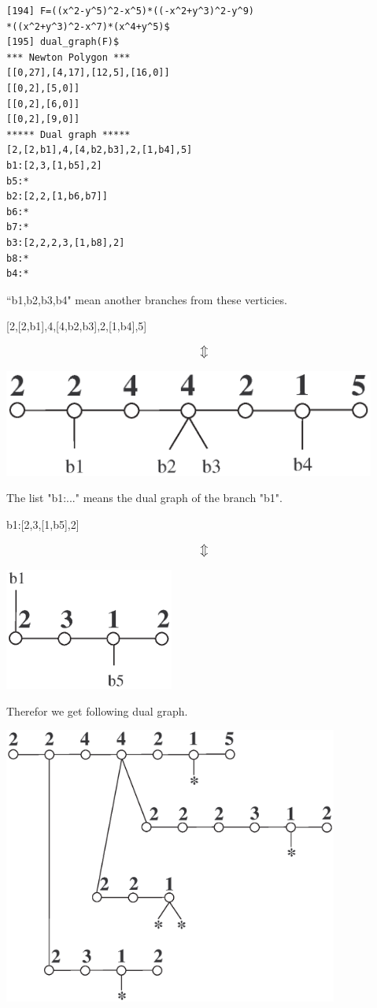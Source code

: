 \documentclass[a4paper,12pt]{article}
\begin{document}
\begin{verbatim}
[194] F=((x^2-y^5)^2-x^5)*((-x^2+y^3)^2-y^9)
*((x^2+y^3)^2-x^7)*(x^4+y^5)$
[195] dual_graph(F)$
*** Newton Polygon ***
[[0,27],[4,17],[12,5],[16,0]]
[[0,2],[5,0]]
[[0,2],[6,0]]
[[0,2],[9,0]]
***** Dual graph *****
[2,[2,b1],4,[4,b2,b3],2,[1,b4],5]
b1:[2,3,[1,b5],2]
b5:*
b2:[2,2,[1,b6,b7]]
b6:*
b7:*
b3:[2,2,2,3,[1,b8],2]
b8:*
b4:*
\end{verbatim}

``b1,b2,b3,b4" mean another branches from these verticies.

\begin{center}
{\large [2,[2,b1],4,[4,b2,b3],2,[1,b4],5]}
\end{center}
$$\big\Updownarrow$$
 \centerline{
  \includegraphics*[height=3.5cm]{ex2dual1.eps}
 }
\vspace*{6pt}

The list "b1:..." means the dual graph of the branch "b1".

\begin{center}
{\large b1:[2,3,[1,b5],2]}
\end{center}
$$\big\Updownarrow$$
 \centerline{
  \includegraphics*[height=4cm]{ex2dual2.eps}
 }

Therefor we get following dual graph.

 \centerline{
  \includegraphics*[width=11cm]{dualex2.eps}
 }
\end{document}
